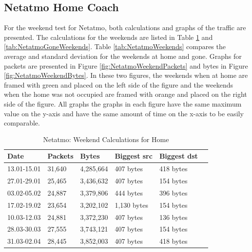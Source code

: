 \subsection{Netatmo Home Coach}
For the weekend test for Netatmo, both calculations and graphs of the traffic are presented. The calculations for the weekends are listed in Table \ref{tab:NetatmoHomeWeekends} and \ref{tab:NetatmoGoneWeekends}. Table \ref{tab:NetatmoWeekends} compares the average and standard deviation for the weekends at home and gone. Graphs for packets are presented in Figure \ref{fig:NetatmoWeekendPackets} and bytes in Figure \ref{fig:NetatmoWeekendBytes}. In these two figures, the weekends when at home are framed with green and placed on the left side of the figure and the weekends when the home was not occupied are framed with orange and placed on the right side of the figure. All graphs the graphs in each figure have the same maximum value on the y-axis and have the same amount of time on the x-axis to be easily comparable. 

\begin{table}[H]
    \centering
    \caption{Netatmo: Weekend Calculations for Home}
    \begin{tabular}{|l|l|l|l|l|l|}
    \hline
        \textbf{Date} & \textbf{Packets} & \textbf{Bytes}  & \textbf{Biggest src} & \textbf{Biggest dst} \\ \hline
        13.01-15.01   & 31,640           & 4,285,664       & 407 bytes            & 418 bytes            \\ \hline
        27.01-29.01   & 25,465           & 3,436,632       & 407 bytes            & 154 bytes            \\ \hline
        03.02-05.02   & 24,887           & 3,379,806       & 444 bytes            & 396 bytes            \\ \hline
        17.02-19.02   & 23,654           & 3,202,102       & 1,130 bytes          & 154 bytes            \\ \hline
        10.03-12.03   & 24,881           & 3,372,230       & 407 bytes            & 136 bytes            \\ \hline
        28.03-30.03   & 27,555           & 3,743,121       & 407 bytes            & 154 bytes            \\ \hline
        31.03-02.04   & 28,445           & 3,852,003       & 407 bytes            & 418 bytes            \\ \hline
    \end{tabular}
    \label{tab:NetatmoHomeWeekends}
\end{table}

